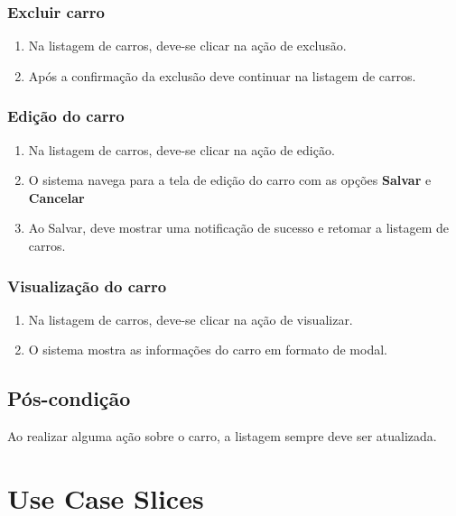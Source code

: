 \documentclass{article}
\begin{document}
\subsubsection{Excluir carro}
\begin{enumerate}
    \item Na listagem de carros, deve-se clicar na ação de exclusão.
    \item Após a confirmação da exclusão deve continuar na listagem de carros.
\end{enumerate}

\subsubsection{Edição do carro}
\begin{enumerate}
    \item Na listagem de carros, deve-se clicar na ação de edição.
    \item O sistema navega para a tela de edição do carro com as opções \textbf{Salvar} e \textbf{Cancelar}
    \item Ao Salvar, deve mostrar uma notificação de sucesso e retomar a listagem de carros.
\end{enumerate}

\subsubsection{Visualização do carro}
\begin{enumerate}
    \item Na listagem de carros, deve-se clicar na ação de visualizar.
    \item O sistema mostra as informações do carro em formato de modal.
\end{enumerate}

\subsection{Pós-condição}
Ao realizar alguma ação sobre o carro, a listagem sempre deve ser atualizada.

\section{Use Case Slices}
\end{document}
